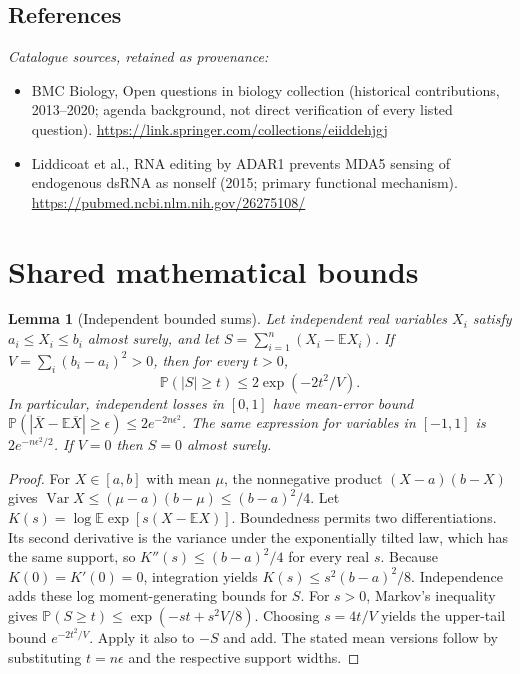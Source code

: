 \documentclass[11pt]{article}
\newcommand{\E}{\mathbb E}
\newcommand{\Prob}{\mathbb P}
\DeclareMathOperator{\Var}{Var}
\providecommand{\E}{\mathbb E}
\providecommand{\Prob}{\mathbb P}
\providecommand{\Var}{\operatorname{Var}}
\newtheorem{sharedlemma}{Lemma}[section]
\begin{document}
\subsection{References}
\noindent\emph{Catalogue sources, retained as provenance:}
\begin{itemize}
\item BMC Biology, Open questions in biology collection (historical contributions, 2013--2020; agenda background, not direct verification of every listed question). \url{https://link.springer.com/collections/eiiddehjgj}
\item Liddicoat et al., RNA editing by ADAR1 prevents MDA5 sensing of endogenous dsRNA as nonself (2015; primary functional mechanism). \url{https://pubmed.ncbi.nlm.nih.gov/26275108/}
\end{itemize}
\clearpage


\appendix
\section{Shared mathematical bounds}\label{app:bounds}
\begin{sharedlemma}[Independent bounded sums]\label{lem:bounded}
Let independent real variables $X_i$ satisfy $a_i\leq X_i\leq b_i$ almost surely,
and let $S=\sum_{i=1}^n(X_i-\E X_i)$. If
$V=\sum_i(b_i-a_i)^2>0$, then for every $t>0$,
\[
 \Prob(|S|\geq t)\leq 2\exp(-2t^2/V).
\]
In particular, independent losses in $[0,1]$ have mean-error bound
$\Prob(|\overline X-\E\overline X|\geq\epsilon)
\leq2e^{-2n\epsilon^2}$. The same expression for variables in $[-1,1]$
is $2e^{-n\epsilon^2/2}$. If $V=0$ then $S=0$ almost surely.
\end{sharedlemma}
\begin{proof}
For $X\in[a,b]$ with mean $\mu$, the nonnegative product
$(X-a)(b-X)$ gives
$\Var X\leq(\mu-a)(b-\mu)\leq(b-a)^2/4$.
Let $K(s)=\log\E\exp[s(X-\E X)]$.
Boundedness permits two differentiations. Its second derivative is the variance
under the exponentially tilted law, which has the same support, so
$K''(s)\leq(b-a)^2/4$ for every real $s$.
Because $K(0)=K'(0)=0$, integration yields
$K(s)\leq s^2(b-a)^2/8$.
Independence adds these log moment-generating bounds for $S$.
For $s>0$, Markov's inequality gives
$\Prob(S\geq t)\leq\exp(-st+s^2V/8)$.
Choosing $s=4t/V$ yields the upper-tail bound $e^{-2t^2/V}$.
Apply it also to $-S$ and add. The stated mean versions follow by substituting
$t=n\epsilon$ and the respective support widths.
\end{proof}
\end{document}
